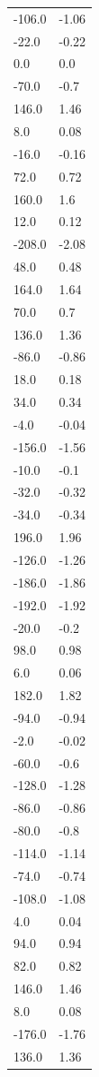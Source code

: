 \begin{longtable}{ll}
-106.0 & -1.06 \\
-22.0 & -0.22 \\
0.0 & 0.0 \\
-70.0 & -0.7 \\
146.0 & 1.46 \\
8.0 & 0.08 \\
-16.0 & -0.16 \\
72.0 & 0.72 \\
160.0 & 1.6 \\
12.0 & 0.12 \\
-208.0 & -2.08 \\
48.0 & 0.48 \\
164.0 & 1.64 \\
70.0 & 0.7 \\
136.0 & 1.36 \\
-86.0 & -0.86 \\
18.0 & 0.18 \\
34.0 & 0.34 \\
-4.0 & -0.04 \\
-156.0 & -1.56 \\
-10.0 & -0.1 \\
-32.0 & -0.32 \\
-34.0 & -0.34 \\
196.0 & 1.96 \\
-126.0 & -1.26 \\
-186.0 & -1.86 \\
-192.0 & -1.92 \\
-20.0 & -0.2 \\
98.0 & 0.98 \\
6.0 & 0.06 \\
182.0 & 1.82 \\
-94.0 & -0.94 \\
-2.0 & -0.02 \\
-60.0 & -0.6 \\
-128.0 & -1.28 \\
-86.0 & -0.86 \\
-80.0 & -0.8 \\
-114.0 & -1.14 \\
-74.0 & -0.74 \\
-108.0 & -1.08 \\
4.0 & 0.04 \\
94.0 & 0.94 \\
82.0 & 0.82 \\
146.0 & 1.46 \\
8.0 & 0.08 \\
-176.0 & -1.76 \\
136.0 & 1.36 \\

\end{longtable}

